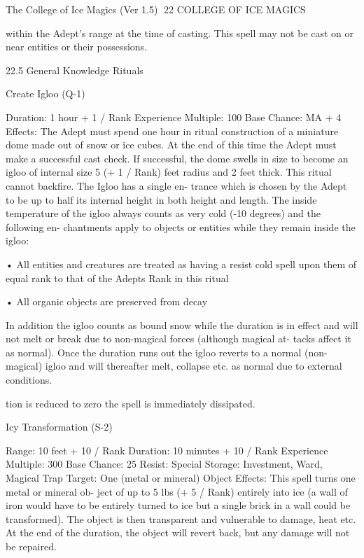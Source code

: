 \begin{Chapter}{The College of Ice Magics (Ver 1.5)}
22 COLLEGE OF ICE MAGICS 

within  the  Adept’s  range  at  the  time  of  casting. 
This  spell  may  not  be  cast  on  or  near  entities  or 
their possessions. 

22.5 General Knowledge Rituals 

Create Igloo (Q-1) 

Duration: 1 hour + 1 / Rank 
Experience Multiple: 100 
Base Chance: MA + 4%
Effects:  The  Adept  must  spend  one  hour  in  ritual 
construction of a miniature dome made out of snow 
or ice cubes. At the end of this time the Adept must 
make  a  successful  cast  check.  If  successful,  the 
dome swells in size to become an igloo of internal 
size 5 (+ 1 / Rank) feet radius and 2 feet thick. This 
ritual  cannot  backfire.  The  Igloo  has  a  single  en-
trance  which  is  chosen  by  the  Adept  to  be  up  to 
half  its  internal  height  in  both  height  and  length. 
The  inside  temperature  of  the  igloo  always  counts 
as  very  cold  (-10  degrees)  and  the  following  en-
chantments  apply  to  objects  or  entities  while  they 
remain inside the igloo:  

•  All  entities  and  creatures  are  treated  as  having  a 
resist cold spell upon them of equal rank to that of 
the Adepts Rank in this ritual  

• All organic objects are preserved from decay 

In  addition  the  igloo  counts  as  bound  snow  while 
the duration is in effect and will not melt or break 
due  to  non-magical  forces  (although  magical  at-
tacks  affect  it  as  normal).  Once  the  duration  runs 
out  the  igloo  reverts  to  a  normal  (non-magical) 
igloo  and  will  thereafter  melt,  collapse  etc.  as 
normal due to external conditions. 

tion  is  reduced  to  zero  the  spell  is  immediately 
dissipated. 

Icy Transformation (S-2) 

Range: 10 feet + 10 / Rank 
Duration: 10 minutes + 10 / Rank 
Experience Multiple: 300 
Base Chance: 25%
Resist: Special 
Storage: Investment, Ward, Magical Trap 
Target: One (metal or mineral) Object 
Effects:  This  spell  turns  one  metal  or  mineral  ob-
ject of up to 5 lbs (+ 5 / Rank) entirely into ice (a 
wall of iron would have to be entirely turned to ice 
but a single brick in a wall could be transformed). 
The  object  is  then  transparent  and  vulnerable  to 
damage,  heat  etc.  At  the  end  of  the  duration,  the 
object will revert back, but any damage will not be 
repaired. 


\end{Chapter}
